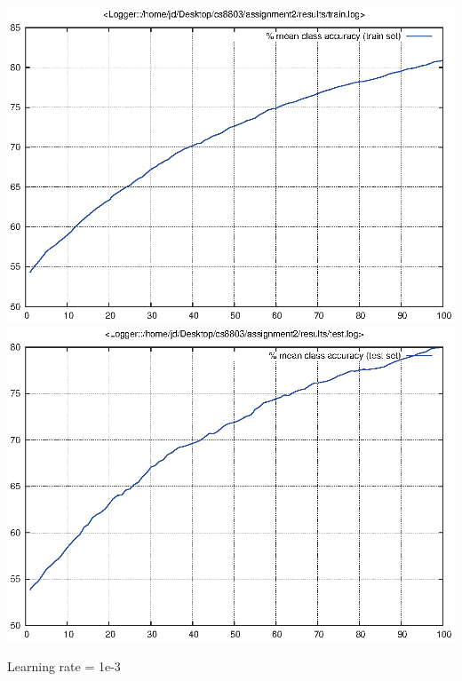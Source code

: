 \documentclass[twoside,12pt]{article}
\newcommand{\imsize}{0.5\linewidth}
\begin{document}
\includegraphics[width=\imsize]{assignment2/results/cd_train}
\includegraphics[width=\imsize]{assignment2/results/cd_test}

Learning rate = 1e-3
\end{document}

